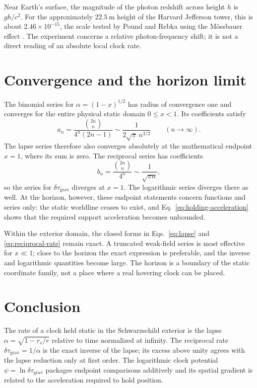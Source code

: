 \documentclass[12pt]{article}
\begin{document}
Near Earth's surface, the magnitude of the photon redshift across height $h$ is $gh/c^2$. For the approximately $22.5\ \mathrm{m}$ height of the Harvard Jefferson tower, this is about $2.46\times10^{-15}$, the scale tested by Pound and Rebka using the M\"ossbauer effect \cite{PoundRebka}. The experiment concerns a relative photon-frequency shift; it is not a direct reading of an absolute local clock rate.

\section{Convergence and the horizon limit}

The binomial series for $\alpha=(1-x)^{1/2}$ has radius of convergence one and converges for the entire physical static domain $0\le x<1$. Its coefficients satisfy
\begin{equation}
  a_n=\frac{\binom{2n}{n}}{4^n(2n-1)}
  \sim\frac{1}{2\sqrt{\pi}\,n^{3/2}}
  \qquad (n\to\infty).
  \label{eq:root-asymptotic}
\end{equation}
The lapse series therefore also converges absolutely at the mathematical endpoint $x=1$, where its sum is zero. The reciprocal series has coefficients
\begin{equation}
  b_n=\frac{\binom{2n}{n}}{4^n}
  \sim\frac{1}{\sqrt{\pi n}},
  \label{eq:inverse-asymptotic}
\end{equation}
so the series for $\delta\tau_{\mathrm{grav}}$ diverges at $x=1$. The logarithmic series diverges there as well. At the horizon, however, these endpoint statements concern functions and series only: the static worldline ceases to exist, and Eq.~\eqref{eq:holding-acceleration} shows that the required support acceleration becomes unbounded.

Within the exterior domain, the closed forms in Eqs.~\eqref{eq:lapse} and \eqref{eq:reciprocal-rate} remain exact. A truncated weak-field series is most effective for $x\ll1$; close to the horizon the exact expression is preferable, and the inverse and logarithmic quantities become large. The horizon is a boundary of the static coordinate family, not a place where a real hovering clock can be placed.

\section{Conclusion}

The rate of a clock held static in the Schwarzschild exterior is the lapse $\alpha=\sqrt{1-r_s/r}$ relative to time normalized at infinity. The reciprocal rate $\delta\tau_{\mathrm{grav}}=1/\alpha$ is the exact inverse of the lapse; its excess above unity agrees with the lapse reduction only at first order. The logarithmic clock potential $\psi=\ln \delta\tau_{\mathrm{grav}}$ packages endpoint comparisons additively and its spatial gradient is related to the acceleration required to hold position.
\end{document}
